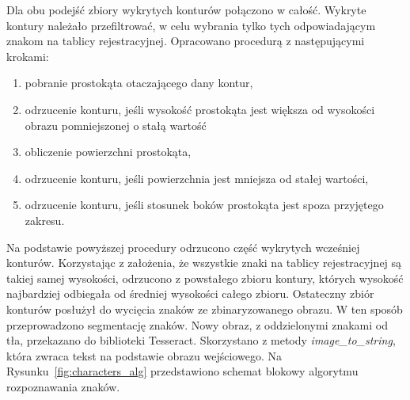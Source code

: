 Dla obu podejść zbiory wykrytych konturów połączono w całość.
Wykryte kontury należało przefiltrować, w celu wybrania tylko tych odpowiadającym znakom na tablicy rejestracyjnej.
Opracowano procedurą z następującymi krokami:
\begin{enumerate}
    \item pobranie prostokąta otaczającego dany kontur,
    \item odrzucenie konturu, jeśli wysokość prostokąta jest większa od wysokości obrazu pomniejszonej o stałą wartość
    \item obliczenie powierzchni prostokąta,
    \item odrzucenie konturu, jeśli powierzchnia jest mniejsza od stałej wartości,
    \item odrzucenie konturu, jeśli stosunek boków prostokąta jest spoza przyjętego zakresu.
\end{enumerate}
Na podstawie powyższej procedury odrzucono część wykrytych wcześniej konturów.
Korzystając z założenia, że wszystkie znaki na tablicy rejestracyjnej są takiej samej wysokości, odrzucono z powstałego zbioru kontury, których wysokość najbardziej odbiegała od średniej wysokości całego zbioru.
Ostateczny zbiór konturów posłużył do wycięcia znaków ze zbinaryzowanego obrazu.
W ten sposób przeprowadzono segmentację znaków.
Nowy obraz, z oddzielonymi znakami od tła, przekazano do biblioteki Tesseract.
Skorzystano z metody \textit{image\_to\_string}, która zwraca tekst na podstawie obrazu wejściowego.
Na Rysunku~\ref{fig:characters_alg} przedstawiono schemat blokowy algorytmu rozpoznawania znaków.
